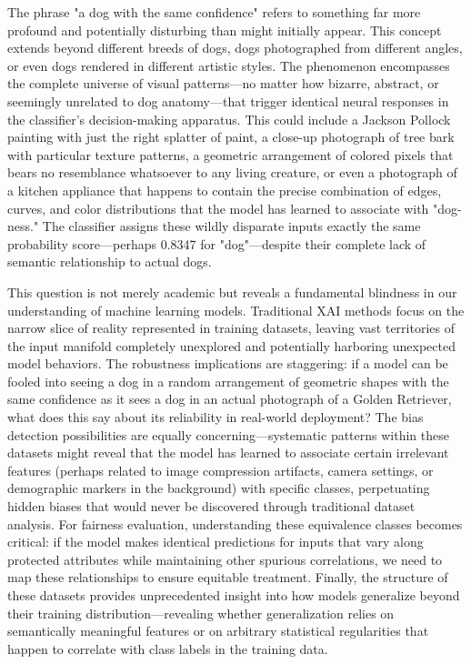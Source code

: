 The phrase "a dog with the same confidence" refers to something far more profound and potentially disturbing than might initially appear. This concept extends beyond different breeds of dogs, dogs photographed from different angles, or even dogs rendered in different artistic styles. The phenomenon encompasses the complete universe of visual patterns—no matter how bizarre, abstract, or seemingly unrelated to dog anatomy—that trigger identical neural responses in the classifier's decision-making apparatus. This could include a Jackson Pollock painting with just the right splatter of paint, a close-up photograph of tree bark with particular texture patterns, a geometric arrangement of colored pixels that bears no resemblance whatsoever to any living creature, or even a photograph of a kitchen appliance that happens to contain the precise combination of edges, curves, and color distributions that the model has learned to associate with "dog-ness." The classifier assigns these wildly disparate inputs exactly the same probability score—perhaps 0.8347 for "dog"—despite their complete lack of semantic relationship to actual dogs.

This question is not merely academic but reveals a fundamental blindness in our understanding of machine learning models. Traditional XAI methods focus on the narrow slice of reality represented in training datasets, leaving vast territories of the input manifold completely unexplored and potentially harboring unexpected model behaviors. The robustness implications are staggering: if a model can be fooled into seeing a dog in a random arrangement of geometric shapes with the same confidence as it sees a dog in an actual photograph of a Golden Retriever, what does this say about its reliability in real-world deployment? The bias detection possibilities are equally concerning—systematic patterns within these datasets might reveal that the model has learned to associate certain irrelevant features (perhaps related to image compression artifacts, camera settings, or demographic markers in the background) with specific classes, perpetuating hidden biases that would never be discovered through traditional dataset analysis. For fairness evaluation, understanding these equivalence classes becomes critical: if the model makes identical predictions for inputs that vary along protected attributes while maintaining other spurious correlations, we need to map these relationships to ensure equitable treatment. Finally, the structure of these datasets provides unprecedented insight into how models generalize beyond their training distribution—revealing whether generalization relies on semantically meaningful features or on arbitrary statistical regularities that happen to correlate with class labels in the training data.

